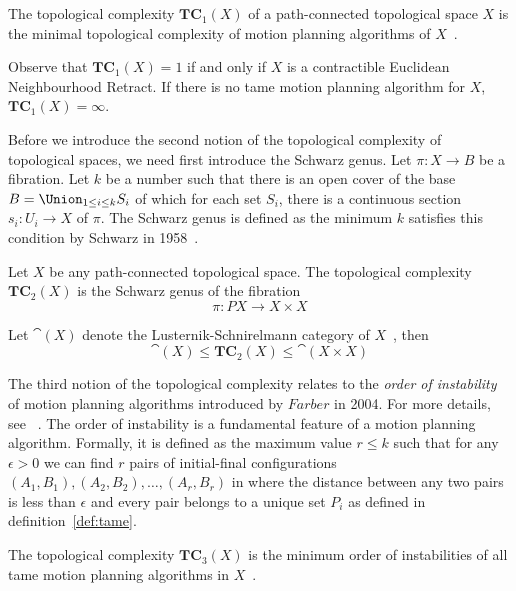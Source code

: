 \begin{definition}
  The topological complexity \(\mathbf{TC}_1(X)\) of a path-connected topological space \(X\) is the minimal topological complexity of motion planning algorithms of \(X\)~\cite{farber2006topology}.
\end{definition}

Observe that \(\mathbf{TC}_1(X)=1\) if and only if \(X\) is a contractible Euclidean Neighbourhood Retract.
If there is no tame motion planning algorithm for \(X\), \(\mathbf{TC}_1(X)=\infty\).

Before we introduce the second notion of the topological complexity of topological spaces, we need first introduce the Schwarz genus.
Let \(\pi: X\to B\) be a fibration. Let \(k\) be a number such that there is an open cover of the base \(B=\Union_{1\le i\le k} S_i\) of which for each set \(S_i\), there is a continuous section \(s_i:U_i\to X\) of \(\pi\).
The Schwarz genus is defined as the minimum \(k\) satisfies this condition by Schwarz in 1958~\cite{schwarz1962genus}.

\begin{definition}
  Let \(X\) be any path-connected topological space. The topological complexity \(\mathbf{TC}_2(X)\) is the Schwarz genus of the fibration~\cite{farber2006topology}
  \[\pi:PX\to X\times X\]
\end{definition}

Let \(\cat(X)\) denote the Lusternik-Schnirelmann category of \(X\)~\cite{cornea2003lusternik}, then
\[\cat(X)\le \mathbf{TC}_2(X)\le \cat(X\times X)\]

The third notion of the topological complexity relates to the \emph{order of instability} of motion planning algorithms introduced by \(Farber\) in 2004. For more details, see ~\cite{farber2004instabilities}.
The order of instability is a fundamental feature of a motion planning algorithm.
Formally, it is defined as the maximum value \(r\le k\) such that for any \(\epsilon>0\) we can find \(r\) pairs of initial-final configurations \((A_1,B_1),(A_2,B_2),\dots,(A_r,B_r)\) in where the distance between any two pairs is less than \(\epsilon\) and every pair belongs to a unique set \(P_i\) as defined in definition~\ref{def:tame}.

\begin{definition}
  The topological complexity \(\mathbf{TC}_3(X)\) is the minimum order of instabilities of all tame motion planning algorithms in \(X\)~\cite{farber2006topology}.
\end{definition}

